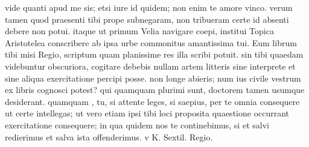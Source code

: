 


 vide quanti apud me sis; etsi iure id quidem; non enim te amore vinco. verum tamen quod praesenti tibi prope subnegaram, non tribueram certe id absenti debere non potui. itaque ut primum Velia navigare coepi, institui Topica Aristotelea conscribere ab ipsa urbe commonitus amantissima tui. Eum librum tibi misi Regio, scriptum quam planissime res illa scribi potuit. sin tibi quaedam videbuntur obscuriora, cogitare debebis nullam artem litteris sine interprete et sine aliqua exercitatione percipi posse. non longe abieris; num ius civile vestrum ex libris cognosci potest? qui quamquam plurimi sunt, doctorem tamen usumque desiderant. quamquam , tu, si attente leges, si saepius, per te omnia consequere ut certe intellegas; ut vero etiam ipsi tibi loci proposita quaestione occurrant exercitatione consequere; in qua quidem nos te continebimus, si et salvi redierimus et salva ista offenderimus. v K. Sextil. Regio.
